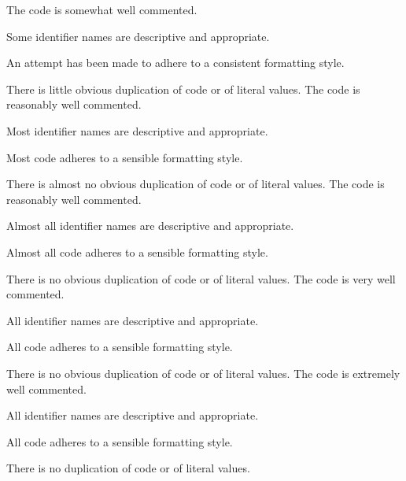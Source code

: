 \documentclass{../fal_assignment}
\begin{document}
\begin{markingrubric}
        \grade The code is somewhat well commented.
            \par Some identifier names are descriptive and appropriate.
            \par An attempt has been made to adhere to a consistent formatting style.
             \par There is little obvious duplication of code or of literal values.           
        \grade The code is reasonably well commented.
            \par Most identifier names are descriptive and appropriate.
            \par Most code adheres to a sensible formatting style.
             \par There is almost no obvious duplication of code or of literal values.   
        \grade The code is reasonably well commented.
            \par Almost all identifier names are descriptive and appropriate.
            \par Almost all code adheres to a sensible formatting style.
             \par There is no obvious duplication of code or of literal values.
        \grade The code is very well commented.
            \par All identifier names are descriptive and appropriate.
            \par All code adheres to a sensible formatting style.
             \par There is no obvious duplication of code or of literal values.
        \grade The code is extremely well commented.
            \par All identifier names are descriptive and appropriate.
            \par All code adheres to a sensible formatting style.
            \par There is no duplication of code or of literal values.
\end{markingrubric}
\end{document}
